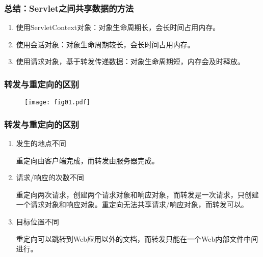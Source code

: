 \begin{frame}[fragile] %
\frametitle{总结：Servlet之间共享数据的方法} 

\begin{enumerate}
\item {\hei 使用ServletContext对象：}对象生命周期长，会长时间占用内存。
\item {\hei 使用会话对象：}对象生命周期较长，会长时间占用内存。
\item {\hei 使用请求对象，基于转发传递数据：}对象生命周期短，内存会及时释放。
\end{enumerate}
\end{frame}

\begin{frame}[fragile] %
\frametitle{转发与重定向的区别} 

\begin{figure}
\centering
\texttt{[image: fig01.pdf]}
\end{figure}
\end{frame}

\begin{frame}[fragile] %
\frametitle{转发与重定向的区别} 

\begin{enumerate}
\item 发生的地点不同

{\kai 重定向由客户端完成，而转发由服务器完成。}

\item 请求/响应的次数不同

{\kai 重定向两次请求，创建两个请求对象和响应对象，而转发是一次请求，只创建一个请求对象和响应对象。重定向无法共享请求/响应对象，而转发可以。}

\item 目标位置不同

{\kai 重定向可以跳转到Web应用以外的文档，而转发只能在一个Web内部文件中间进行。}
\end{enumerate}
\end{frame}

